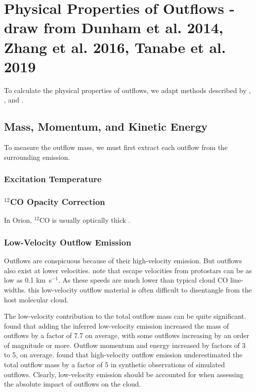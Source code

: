\documentclass[twocolumn]{aastex62}
\newcommand{\kms}{km~s$^{-1}$}
\newcommand{\co}[1][]{\ensuremath{^{#1}}CO}
\begin{document}
\section{Physical Properties of Outflows - draw from Dunham et al. 2014, Zhang et al. 2016, Tanabe et al. 2019}
To calculate the physical properties of outflows, we adapt methods described by \citet{Arce01}, \citet{Dunham14}, and \citet{ZhangY16}.

\subsection{Mass, Momentum, and Kinetic Energy}
To measure the outflow mass, we must first extract each outflow from the surrounding emission. 

\subsubsection{Excitation Temperature}

\subsubsection{$^{12}$CO Opacity Correction}
In Orion, \co[12] is usually optically thick \citep{Kong18}. 

\subsubsection{Low-Velocity Outflow Emission}
Outflows are conspicuous because of their high-velocity emission. But outflows also exist at lower velocities. \citet{Dunham14} note that escape velocities from protostars can be as low as 0.1 \kms. As these speeds are much lower than typical cloud CO line-widths. this low-velocity outflow material is often difficult to disentangle from the host molecular cloud.

The low-velocity contribution to the total outflow mass can be quite significant. \citet{Dunham14} found that adding the inferred low-velocity emission increased the mass of outflows by a factor of 7.7 on average, with some outflows increasing by an order of magnitude or more. Outflow momentum and energy increased by factors of 3 to 5, on average.  \citet{Offner11} found that high-velocity outflow emission underestimated the total outflow mass by a factor of 5 in synthetic observations of simulated outflows. Clearly, low-velocity emission should be accounted for when assessing the absolute impact of outflows on the cloud.
\end{document}
